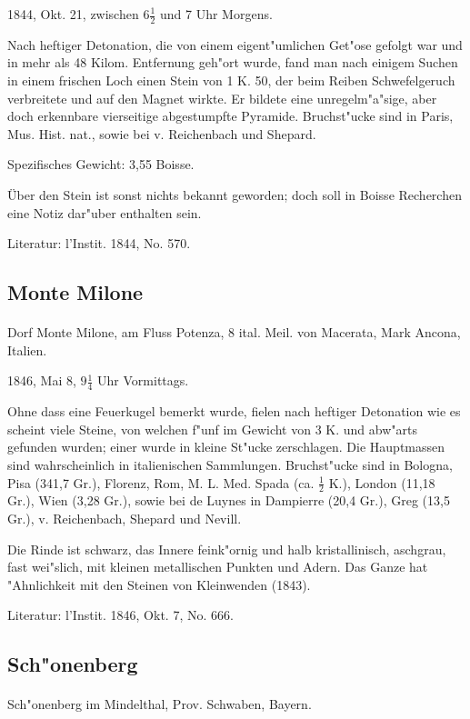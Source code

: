 \documentclass[a4paper, 11pt, oneside]{article}
\begin{document}
1844, Okt. 21, zwischen $6\frac{1}{2}$ und 7 Uhr Morgens.

Nach heftiger Detonation, die von einem eigent"umlichen Get"ose gefolgt war und in mehr als 48 Kilom. Entfernung geh"ort wurde, fand man nach einigem Suchen in einem frischen Loch einen Stein von 1 K. 50, der beim Reiben Schwefelgeruch verbreitete und auf den Magnet wirkte. Er bildete eine unregelm"a"sige, aber doch erkennbare vierseitige abgestumpfte Pyramide. Bruchst"ucke sind in Paris, Mus. Hist. nat., sowie bei v. Reichenbach und Shepard.

Spezifisches Gewicht: 3,55 Boisse.

Über den Stein ist sonst nichts bekannt geworden; doch soll in Boisse Recherchen eine Notiz dar"uber enthalten sein.

\footnotesize
Literatur: l'Instit. 1844, No. 570.

\subsection{Monte Milone}
\normalsize
\paragraph{}
Dorf Monte Milone, am Fluss Potenza, 8 ital. Meil. von Macerata, Mark Ancona, Italien.

1846, Mai 8, $9\frac{1}{4}$ Uhr Vormittags.

Ohne dass eine Feuerkugel bemerkt wurde, fielen nach heftiger Detonation wie es scheint viele Steine, von welchen f"unf im Gewicht von 3 K. und abw"arts gefunden wurden; einer wurde in kleine St"ucke zerschlagen. Die Hauptmassen sind wahrscheinlich in italienischen Sammlungen. Bruchst"ucke sind in Bologna, Pisa (341,7 Gr.), Florenz, Rom, M. L. Med. Spada (ca. $\frac{1}{2}$ K.), London (11,18 Gr.), Wien (3,28 Gr.), sowie bei de Luynes in Dampierre (20,4 Gr.), Greg (13,5 Gr.), v. Reichenbach, Shepard und Nevill.

Die Rinde ist schwarz, das Innere feink"ornig und halb kristallinisch, aschgrau, fast wei"slich, mit kleinen metallischen Punkten und Adern. Das Ganze hat "Ahnlichkeit mit den Steinen von Kleinwenden (1843).

\footnotesize
Literatur: l'Instit. 1846, Okt. 7, No. 666.

\subsection{Sch"onenberg}
\normalsize
\paragraph{}
Sch"onenberg im Mindelthal, Prov. Schwaben, Bayern.
\end{document}

